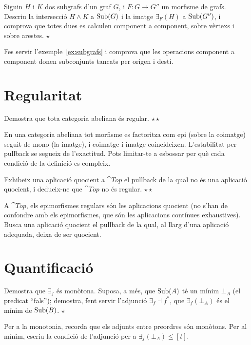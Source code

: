 \begin{exercici}
Siguin $H$ i $K$ dos subgrafs d'un graf $G$, i $F\colon G\to G''$ un morfisme de grafs. Descriu la intersecció $H\wedge K$ a $\operatorname{Sub}(G)$ i la imatge $\exists_F(H)$ a $\operatorname{Sub}(G'')$, i comprova que totes dues es calculen component a component, sobre vèrtexs i sobre arestes. \hfill{\normalfont$\star$}
\begin{indicacio}
Fes servir l'exemple~\ref{ex:subgrafs} i comprova que les operacions component a component donen subconjunts tancats per origen i destí.
\end{indicacio}
\end{exercici}

\section{Regularitat}

\begin{exercici}
Demostra que tota categoria abeliana és regular. \hfill{\normalfont$\star\star$}
\begin{indicacio}
En una categoria abeliana tot morfisme es factoritza com epi (sobre la coimatge) seguit de mono (la imatge), i coimatge i imatge coincideixen. L'estabilitat per pullback se segueix de l'exactitud. Pots limitar-te a esbossar per què cada condició de la definició es compleix.
\end{indicacio}
\end{exercici}

\begin{exercici}
Exhibeix una aplicació quocient a $\cat{Top}$ el pullback de la qual no és una aplicació quocient, i dedueix-ne que $\cat{Top}$ no és regular. \hfill{\normalfont$\star\star$}
\begin{indicacio}
A $\cat{Top}$, els epimorfismes regulars són les aplicacions quocient (no s'han de confondre amb els epimorfismes, que són les aplicacions contínues exhaustives). Busca una aplicació quocient el pullback de la qual, al llarg d'una aplicació adequada, deixa de ser quocient.
\end{indicacio}
\end{exercici}

\section{Quantificació}

\begin{exercici}
Demostra que $\exists_f$ és monòtona. Suposa, a més, que $\operatorname{Sub}(A)$ té un mínim $\bot_A$ (el predicat \enquote{fals}); demostra, fent servir l'adjunció $\exists_f\dashv f^{*}$, que $\exists_f(\bot_A)$ és el mínim de $\operatorname{Sub}(B)$. \hfill{\normalfont$\star$}
\begin{indicacio}
Per a la monotonia, recorda que els adjunts entre preordres són monòtons. Per al mínim, escriu la condició de l'adjunció per a $\exists_f(\bot_A)\leq[t]$.
\end{indicacio}
\end{exercici}

